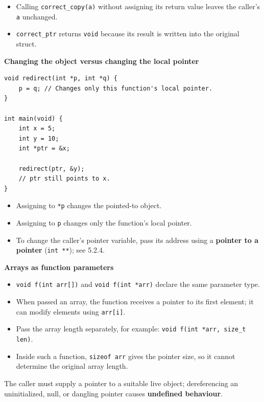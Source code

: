 \documentclass[11pt,a4paper]{article}
\begin{document}
\begin{itemize}
    \item Calling \texttt{correct\_copy(a)} without assigning its
          return value leaves the caller's \texttt{a} unchanged.
    \item \texttt{correct\_ptr} returns \texttt{void} because its
          result is written into the original struct.
\end{itemize}

\textbf{Changing the object versus changing the local pointer}

\begin{lstlisting}[style=cscode,
    morekeywords={[2]{redirect}}]
void redirect(int *p, int *q) {
    p = q; // Changes only this function's local pointer.
}

int main(void) {
    int x = 5;
    int y = 10;
    int *ptr = &x;

    redirect(ptr, &y);
    // ptr still points to x.
}
\end{lstlisting}

\begin{itemize}
    \item Assigning to \texttt{*p} changes the pointed-to object.
    \item Assigning to \texttt{p} changes only the function's
          local pointer.
    \item To change the caller's pointer variable, pass its
          address using a \textbf{pointer to a pointer}
          (\texttt{int **}); see 5.2.4.
\end{itemize}

\textbf{Arrays as function parameters}

\begin{itemize}
    \item \texttt{void f(int arr[])} and
          \texttt{void f(int *arr)} declare the same parameter type.
    \item When passed an array, the function receives a pointer
          to its first element; it can modify elements using
          \texttt{arr[i]}.
    \item Pass the array length separately, for example:
          \texttt{void f(int *arr, size\_t len)}.
    \item Inside such a function, \texttt{sizeof arr} gives the
          pointer size, so it cannot determine the original
          array length.
\end{itemize}

The caller must supply a pointer to a suitable live object;
dereferencing an uninitialized, null, or dangling pointer
causes \textbf{undefined behaviour}.
\end{document}

